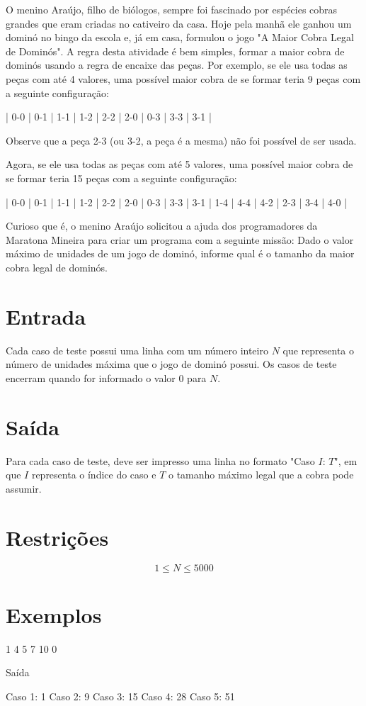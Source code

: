 O menino Araújo, filho de biólogos, sempre foi fascinado por espécies cobras grandes que eram criadas no cativeiro da casa. Hoje pela manhã ele ganhou um dominó no bingo da escola e, já em casa, formulou o jogo "A Maior Cobra Legal de Dominós". A regra desta atividade é bem simples, formar a maior cobra de dominós usando a regra de encaixe das peças. Por exemplo, se ele usa todas as peças com até 4 valores, uma possível maior cobra de se formar teria 9 peças com a seguinte configuração:

| 0-0 | 0-1 | 1-1 | 1-2 | 2-2 | 2-0 | 0-3 | 3-3 | 3-1 |

Observe que a peça 2-3 (ou 3-2, a peça é a mesma) não foi possível de ser usada.

Agora, se ele usa todas as peças com até 5 valores, uma possível maior cobra de se formar teria 15 peças com a seguinte configuração:

| 0-0 | 0-1 | 1-1 | 1-2 | 2-2 | 2-0 | 0-3 | 3-3 | 3-1 | 1-4 | 4-4 | 4-2 | 2-3 | 3-4 | 4-0 |

Curioso que é, o menino Araújo solicitou a ajuda dos programadores da Maratona Mineira para criar um programa com a seguinte missão: Dado o valor máximo de unidades de um jogo de dominó, informe qual é o tamanho da maior cobra legal de dominós.


\section*{Entrada}

Cada caso de teste possui uma linha com um número inteiro $N$ que representa o número de unidades máxima que o jogo de dominó possui. Os casos de teste encerram quando for informado o valor 0 para $N$.

\section*{Saída}

Para cada caso de teste, deve ser impresso uma linha no formato "Caso $I$: $T$", em que $I$ representa o índice do caso e $T$ o tamanho máximo legal que a cobra pode assumir.

\section*{Restrições}

$$1 \leq N \leq 5000$$

\section*{Exemplos}

1
4
5
7
10
0

Saída

Caso 1: 1
Caso 2: 9
Caso 3: 15
Caso 4: 28
Caso 5: 51
\exemplo
